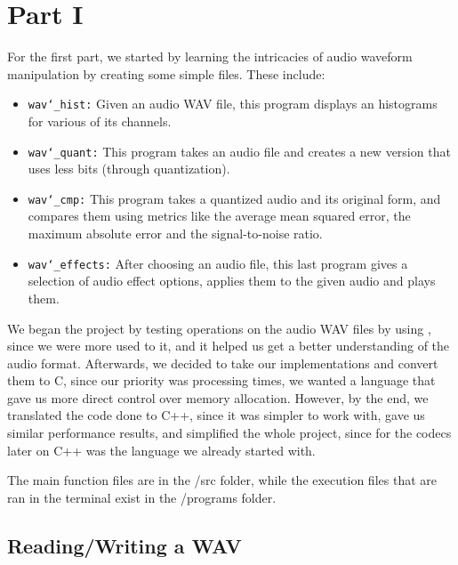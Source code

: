\begingroup
\let\clearpage\relax
\chapter{Part I}

For the first part, we started by learning the intricacies of audio waveform manipulation by creating some simple files. These include:

\begin{itemize}
    \item \texttt{wav\char`_hist:} Given an audio WAV file, this program displays an histograms for various of its channels.

    \item \texttt{wav\char`_quant:} This program takes an audio file and creates a new version that uses less bits (through quantization).

    \item \texttt{wav\char`_cmp:} This program takes a quantized audio and its original form, and compares them using metrics like the average mean squared error, the maximum absolute error and the signal-to-noise ratio.

    \item \texttt{wav\char`_effects:} After choosing an audio file, this last program gives a selection of audio effect options, applies them to the given audio and plays them.
\end{itemize}

We began the project by testing operations on the audio WAV files by using , since we were more used to it, and it helped us get a better understanding of the audio format. Afterwards, we decided to take our  implementations and convert them to C, since our priority was processing times, we wanted a language that gave us more direct control over memory allocation. However, by the end, we translated the code done to C++, since it was simpler to work with, gave us similar performance results, and simplified the whole project, since for the codecs later on C++ was the language we already started with.

The main function files are in the /src folder, while the execution files that are ran in the terminal exist in the /programs folder.

\vspace{10pt}
\section{Reading/Writing a WAV}

